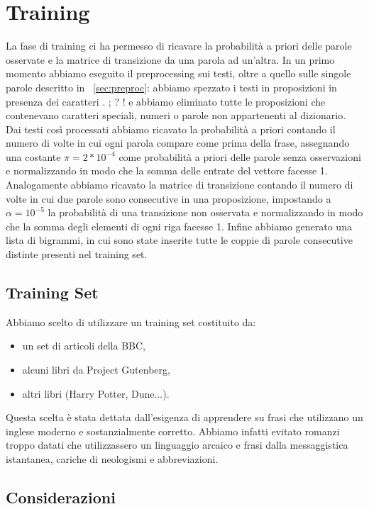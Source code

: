 \section{Training}
\label{sec:training}
La fase di training ci ha permesso di ricavare la probabilità a priori delle parole osservate e la matrice di transizione da una parola ad un’altra. 
In un primo momento abbiamo eseguito il preprocessing sui testi, oltre a quello sulle singole parole descritto in ~\ref{sec:preproc}: abbiamo spezzato i testi in proposizioni in presenza dei caratteri . ; ? ! e abbiamo eliminato tutte le proposizioni che contenevano caratteri speciali, numeri o parole non appartenenti al dizionario. Dai testi così processati abbiamo ricavato la probabilità a priori contando il numero di volte in cui ogni parola compare come prima della frase, assegnando una costante $\pi =2*10^{-4}$ come probabilità a priori delle parole senza osservazioni e normalizzando in modo che la somma delle entrate del vettore facesse 1. Analogamente abbiamo ricavato la matrice di transizione contando il numero di volte in cui due parole sono consecutive in una proposizione, impostando a $\alpha=10^{-5}$ la probabilità di una transizione non osservata e normalizzando in modo che la somma degli elementi di ogni riga facesse 1. 
Infine abbiamo generato una lista di bigrammi, in cui sono state inserite tutte le coppie di parole consecutive distinte presenti nel training set.  
\subsection{Training Set}
Abbiamo scelto di utilizzare un training set costituito da:
\begin{itemize}
\item un set di articoli della BBC,
\item alcuni libri da Project Gutenberg,
\item altri libri (Harry Potter, Dune...).

\end{itemize}
Questa scelta è stata dettata dall'esigenza di apprendere su frasi che utilizzano un inglese moderno e sostanzialmente corretto. Abbiamo infatti evitato romanzi troppo datati che utilizzassero un linguaggio arcaico e frasi dalla messaggistica istantanea, cariche di neologismi e abbreviazioni.

\subsection{Considerazioni}
